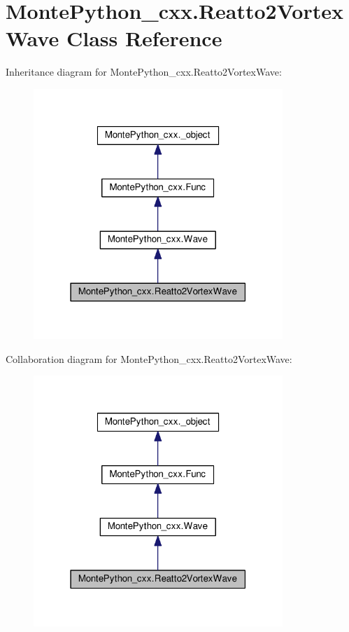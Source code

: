 \hypertarget{classMontePython__cxx_1_1Reatto2VortexWave}{}\section{Monte\+Python\+\_\+cxx.\+Reatto2\+Vortex\+Wave Class Reference}
\label{classMontePython__cxx_1_1Reatto2VortexWave}


Inheritance diagram for Monte\+Python\+\_\+cxx.\+Reatto2\+Vortex\+Wave\+:
\nopagebreak
\begin{figure}[H]
\begin{center}
\leavevmode
\includegraphics[width=267pt]{classMontePython__cxx_1_1Reatto2VortexWave__inherit__graph}
\end{center}
\end{figure}


Collaboration diagram for Monte\+Python\+\_\+cxx.\+Reatto2\+Vortex\+Wave\+:
\nopagebreak
\begin{figure}[H]
\begin{center}
\leavevmode
\includegraphics[width=267pt]{classMontePython__cxx_1_1Reatto2VortexWave__coll__graph}
\end{center}
\end{figure}
